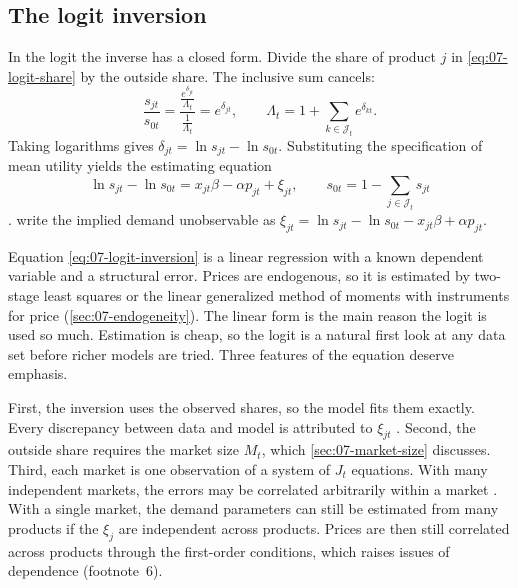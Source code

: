 \subsection{The logit inversion}\label{sec:07-inversion-logit}

In the logit the inverse has a closed form. Divide the share of product $j$ in \eqref{eq:07-logit-share} by the
outside share. The inclusive sum cancels:
\begin{equation*}
  \frac{s_{jt}}{s_{0t}} = \frac{\frac{e^{\delta_{jt}}}{\Lambda_t}}{\frac{1}{\Lambda_t}} = e^{\delta_{jt}},
  \qquad \Lambda_t = 1 + \sum_{k \in \mathcal{J}_t} e^{\delta_{kt}} .
\end{equation*}
Taking logarithms gives $\delta_{jt} = \ln s_{jt} - \ln s_{0t}$. Substituting the specification of mean utility
yields the estimating equation
\begin{equation}\label{eq:07-logit-inversion}
  \ln s_{jt} - \ln s_{0t} = x_{jt}\beta - \alpha p_{jt} + \xi_{jt}, \qquad
  s_{0t} = 1 - \sum_{j \in \mathcal{J}_t} s_{jt}
\end{equation}
\citep[eq.~14]{Berry1994}. \citet[eqs.~6.4 and 6.5]{BerryLevinsohnPakes1995} write the implied demand
unobservable as $\xi_{jt} = \ln s_{jt} - \ln s_{0t} - x_{jt}\beta + \alpha p_{jt}$.

Equation \eqref{eq:07-logit-inversion} is a linear regression with a known dependent variable and a structural
error. Prices are endogenous, so it is estimated by two-stage least squares or the linear generalized method of moments with instruments for
price (\cref{sec:07-endogeneity}). The linear form is the main reason the logit is used so much. Estimation is
cheap, so the logit is a natural first look at any data set before richer models are tried. Three features of
the equation deserve emphasis.

First, the inversion uses the observed shares, so the model fits them exactly. Every discrepancy between data and
model is attributed to $\xi_{jt}$ \citep[p.~533]{Nevo2000a}. Second, the outside share requires the market size
$M_t$, which \cref{sec:07-market-size} discusses. Third, each market is one observation of a system of $J_t$
equations. With many independent markets, the errors may be correlated arbitrarily within a market
\citep[p.~250]{Berry1994}. With a single market, the demand parameters can still be estimated from many
products if the $\xi_j$ are independent across products. Prices are then still correlated across products
through the first-order conditions, which raises issues of dependence (footnote~6).

